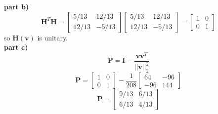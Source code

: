 \documentclass{article} %
\begin{document}
\textbf{part b)} \\
\begin{equation}
\boldsymbol{H}^T\boldsymbol{H} = \begin{bmatrix} 5/13 & 12/13 \\ 12/13 & -5/13 \end{bmatrix} \begin{bmatrix} 5/13 & 12/13 \\ 12/13 & -5/13 \end{bmatrix} = \begin{bmatrix} 1 & 0 \\ 0 & 1 \end{bmatrix} 
\end{equation}
so $\boldsymbol{H}(\boldsymbol{v})$ is unitary. \\

\textbf{part c)} \\
\begin{equation}
\boldsymbol{P} = \boldsymbol{I} - \frac{\boldsymbol{vv}^T}{||\boldsymbol{v}||_2^2}
\end{equation}
\begin{equation}
\boldsymbol{P} = \begin{bmatrix} 1 & 0 \\ 0 & 1 \end{bmatrix} - \frac{1}{208} \begin{bmatrix} 64 & -96 \\ -96 & 144 \end{bmatrix}
\end{equation}
\begin{equation}
\boldsymbol{P} = \begin{bmatrix} 9/13 & 6/13 \\ 6/13 & 4/13 \end{bmatrix}
\end{equation}
\\
\end{document}
